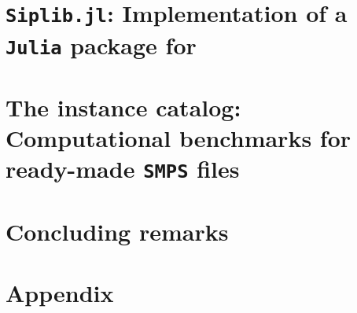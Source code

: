 \section{\texttt{Siplib.jl}: Implementation of a \texttt{Julia} package for \siplibtwo} \label{sec:tutorial}

\pagebreak

%

\section{The instance catalog: Computational benchmarks for ready-made \texttt{SMPS} files}\label{sec:instance_catalog}

\pagebreak

\section{Concluding remarks}\label{sec:conclusion}

\pagebreak


\appendix
\section*{Appendix}

\pagebreak


\pagebreak


\pagebreak





